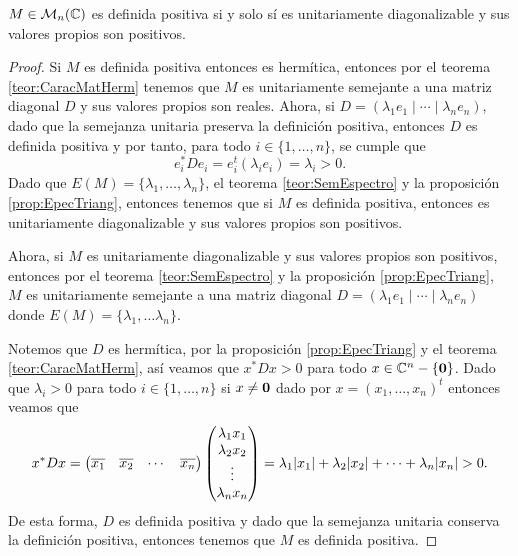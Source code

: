 \begin{teor}
  $M \in \mathcal{M}_n(\mathbb{C})$ es definida positiva si y solo sí es unitariamente diagonalizable y sus valores propios son positivos.
\end{teor}
\begin{proof}
  Si $M$ es definida positiva entonces es hermítica, entonces por el teorema \ref{teor:CaracMatHerm} tenemos que $M$ es unitariamente semejante a una matriz diagonal $D$ y sus valores propios son reales. Ahora, si $D = (\lambda_1 e_1 \mid \cdots \mid  \lambda_n e_n)$, dado que la semejanza unitaria preserva la definición positiva, entonces $D$ es definida positiva y por tanto, para todo $i\in\{1,\ldots,n\}$, se cumple que
    \[
      e_i^* D e_i = e_i^t (\lambda_i e_i) = \lambda_i > 0.
    \]
  Dado que $E(M) = \{\lambda_1,\ldots,\lambda_n\}$, el teorema \ref{teor:SemEspectro} y la proposición \ref{prop:EpecTriang}, entonces tenemos que si $M$ es definida positiva, entonces es unitariamente diagonalizable y sus valores propios son positivos.

  Ahora, si $M$ es unitariamente diagonalizable y sus valores propios son positivos, entonces por el teorema \ref{teor:SemEspectro} y la proposición \ref{prop:EpecTriang}, $M$ es unitariamente semejante a una matriz diagonal $D = (\lambda_1 e_1 \mid \cdots \mid  \lambda_n e_n)$ donde $E(M) = \{\lambda_1, \ldots \lambda_n\}$.

  Notemos que $D$ es hermítica, por la proposición \ref{prop:EpecTriang} y el teorema \ref{teor:CaracMatHerm}, así veamos que $x^* D x > 0$ para todo $x \in \mathbb{C}^n - \{\mathbf{0}\}$. Dado que $\lambda_i > 0$ para todo $i \in \{1,\ldots,n\}$ si $x \neq \mathbf{0}$ dado por $x = (x_1, \ldots, x_n)^t$ entonces veamos que
  \[
    x^* D x 
      = \begin{pmatrix} \overline{x_1} & \overline{x_2} & \cdots & \overline{x_n} \end{pmatrix} 
        \begin{pmatrix} \lambda_1 x_1 \\ \lambda_2 x_2 \\ \vdots \\ \lambda_n x_n \end{pmatrix}
      = \lambda_1 \mathopen|x_1\mathclose| + \lambda_2 \mathopen|x_2\mathclose| + \cdots + \lambda_n \mathopen|x_n\mathclose| > 0.
  \]
  De esta forma, $D$ es definida positiva y dado que la semejanza unitaria conserva la definición positiva, entonces tenemos que $M$ es definida positiva.
\end{proof}